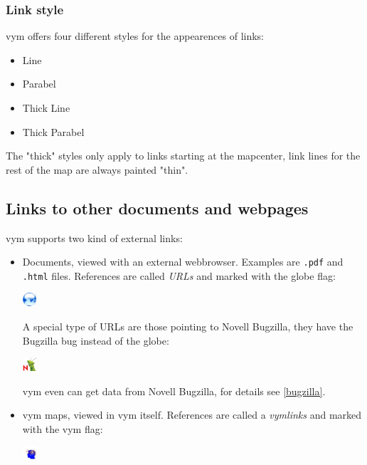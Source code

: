 \documentclass[12pt,a4paper]{article}
\newcommand{\vym}{{\sc vym }}
\begin{document}
\subsubsection*{Link style}
\vym offers four different styles for the appearences of links:
\begin{itemize}
    \item Line
    \item Parabel
    \item Thick Line
    \item Thick Parabel
\end{itemize}
The "thick" styles only apply to links starting at the mapcenter, link
lines for the rest of the map are always painted "thin".

\subsection{Links to other documents and webpages}
\vym supports two kind of external links:
\begin{itemize}
    \item Documents, viewed with an external webbrowser.
    Examples are {\tt .pdf} and {\tt .html} files. References 
    are called {\em URLs} and marked with the globe
    flag:
    \begin{center}
	\includegraphics[width=0.5cm]{images/flag-url.png}
    \end{center}
    A special type of URLs are those pointing to Novell Bugzilla, they have
    the Bugzilla bug instead of the globe:
    \begin{center}
	\includegraphics[width=0.5cm]{images/flag-url-bugzilla-novell.png}
    \end{center}
    \vym even can get data from Novell Bugzilla, for details see
    \ref{bugzilla}.


    \item \vym maps, viewed in \vym itself. References are called
    a {\em vymlinks} and marked with the \vym flag:
    \begin{center}
	\includegraphics[width=0.5cm]{images/flag-vymlink.png}
    \end{center}
\end{itemize}
\end{document}
